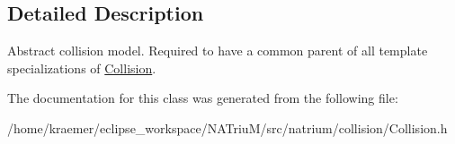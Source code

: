 \subsection{Detailed Description}
Abstract collision model. Required to have a common parent of all template specializations of \hyperlink{classnatrium_1_1Collision}{Collision}. 

The documentation for this class was generated from the following file\-:\begin{DoxyCompactItemize}
\item 
/home/kraemer/eclipse\-\_\-workspace/\-N\-A\-Triu\-M/src/natrium/collision/Collision.\-h\end{DoxyCompactItemize}
